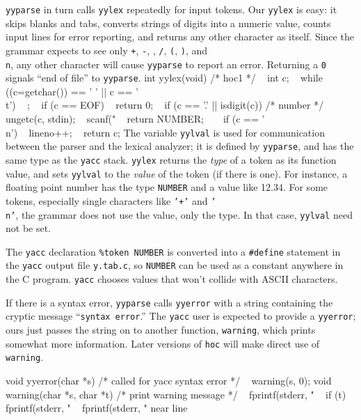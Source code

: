 {{\tt yyparse} in turn calls {\tt yylex} repeatedly for input
tokens. Our {\tt yylex} is easy: it skips blanks and tabs,
converts strings of digits into a numeric value, counts input
lines for error reporting, and returns any other character as
itself.
Since the grammar expects to see only {\tt+}, {\tt-}, {\tt*},
{\tt/}, {\tt(}, {\tt)}, and {\tt\\n}, any other character
will cause {\tt yyparse} to report an error. Returning a {\tt0}
signals ``end of file'' to {\tt yyparse}.
\begincode
int yylex(void)  /* hoc1 */
{
~       int c;
\smallskip
~       while ((c=getchar()) == ' ' || c == '\\t')
~               ;
~       if (c == EOF)
~               return 0;
~       if (c == '.' || isdigit(c)) {   /* number */
~               ungetc(c, stdin);
~               scanf("%
~               return NUMBER;
~       }
~       if (c == '\\n')
~               lineno++;
~       return c;
}
\endcode
\noindent
The variable {\tt yylval} is used for communication between
the parser and the lexical analyzer; it is defined by {\tt yyparse},
and has the same type as the {\tt yacc} stack. {\tt yylex} returns
the {\it type\/} of a token as its function value, and sets
{\tt yylval} to the {\it value\/} of the token (if there is one).
For instance, a floating point number has the type {\tt NUMBER}
and a value like 12.34. For some tokens, especially single
characters like {\tt'+'} and {\tt'\\n'}, the grammar does not use
the value, only the type. In that case, {\tt yylval} need not be set.

The {\tt yacc} declaration {\tt\%token NUMBER} is converted into
a {\tt\#define} statement in the {\tt yacc} output file {\tt y.tab.c},
so {\tt NUMBER} can be used as a constant anywhere in the C program.
{\tt yacc} chooses values that won't collide with {\sc ASCII} characters.

If there is a syntax error, {\tt yyparse} calls {\tt yyerror} with
a string containing the cryptic message ``{\tt syntax error}.''
The {\tt yacc} user is expected to provide a {\tt yyerror}; ours
just passes the string on to another function, {\tt warning},
which prints somewhat more information. Later versions of {\tt hoc}
will make direct use of {\tt warning}.

\begincode
void yyerror(char *s)  /* called for yacc syntax error */
{
~       warning(s, 0);
}
\medbreak
void warning(char *s, char *t)  /* print warning message */
{
~       fprintf(stderr, "%
~       if (t) fprintf(stderr, " %
~       fprintf(stderr, " near line %
}
\endcode

}
